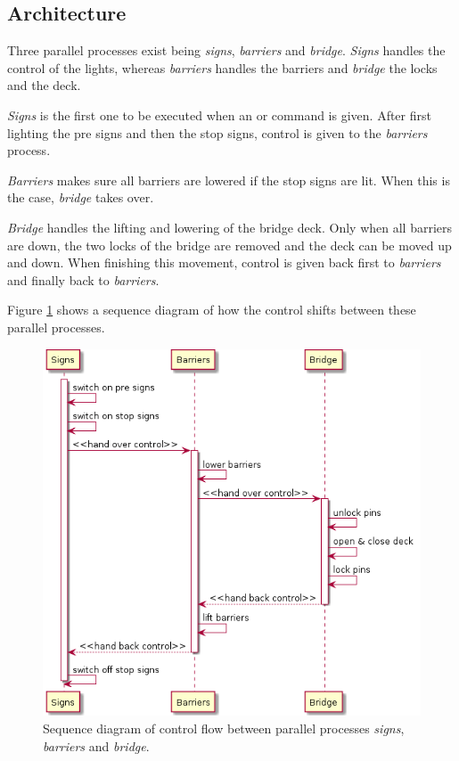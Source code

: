 \subsection{Architecture}
\label{sec:trans}

Three parallel processes exist being \emph{signs}, \emph{barriers} and \emph{bridge}. \emph{Signs} handles the control of the lights, whereas \emph{barriers} handles the barriers and \emph{bridge} the locks and the deck.

\emph{Signs} is the first one to be executed when an  or  command is given. After first lighting the pre signs and then the stop signs, control is given to the \emph{barriers} process.

\emph{Barriers} makes sure all barriers are lowered if the stop signs are lit. When this is the case, \emph{bridge} takes over.

\emph{Bridge} handles the lifting and lowering of the bridge deck. Only when all barriers are down, the two locks of the bridge are removed and the deck can be moved up and down. When finishing this movement, control is given back first to \emph{barriers} and finally back to \emph{barriers}.

Figure \ref{fig:arch} shows a sequence diagram of how the control shifts between these parallel processes.
%
\begin{figure}%
\centering
\includegraphics[width=0.5\columnwidth]{Architecture}%
\caption{Sequence diagram of control flow between parallel processes \emph{signs}, \emph{barriers} and \emph{bridge}.}%
\label{fig:arch}%
\end{figure}

